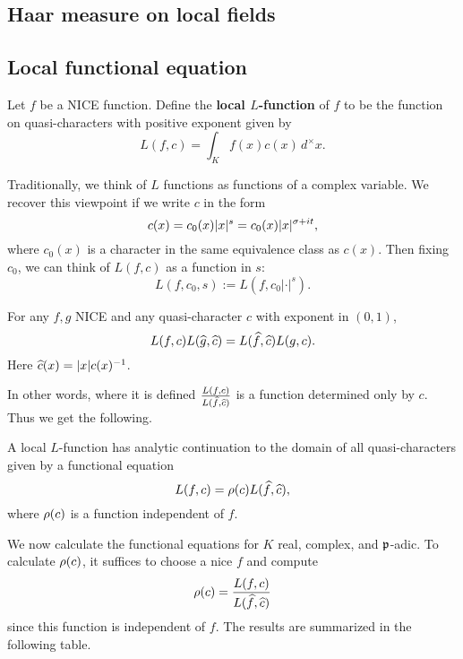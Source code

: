 \subsection{Haar measure on local fields}
\subsection{Local functional equation}
\begin{df}
Let $f$ be a NICE function. Define the \textbf{local $L$-function} of $f$ to be the function on quasi-characters with positive exponent given by
\[
L(f,c)=\int_{K} f(x)c(x)\,d^{\times}x.
\]
\end{df}
Traditionally, we think of $L$ functions as functions of a complex variable. We recover this viewpoint if we write $c$ in the form
\[
c(x)=c_0(x)|x|^{s}=c_0(x)|x|^{\sigma+it},
\]
where $c_0(x)$ is a character in the same equivalence class as $c(x)$. Then fixing $c_0$, we can think of $L(f,c)$ as a function in $s$:
\[
L(f,c_0,s):=L(f,c_0|\cdot |^s).
\]
\begin{lem}
For any $f,g$ NICE and any quasi-character $c$ with exponent in $(0,1)$,
\[
L(f,c)L(\widehat{g},\widehat{c})=L(\widehat{f},\widehat{c})L(g,c).
\]
Here $\widehat{c}(x)=|x|c(x)^{-1}$.
\end{lem}
In other words, where it is defined $\frac{L(f,c)}{L(\widehat{f},\widehat{c})}$ is a function determined only by $c$. Thus we get the following.
\begin{thm}
A local $L$-function has analytic continuation to the domain of all quasi-characters given by a functional equation
\[
L(f,c)=\rho(c)L(\widehat{f},\widehat{c}),
\]
where $\rho(c)$ is a function independent of $f$.
\end{thm}
We now calculate the functional equations for $K$ real, complex, and $\mathfrak{p}$-adic. To calculate $\rho(c)$, it suffices to choose a nice $f$ and compute
\[
\rho(c)=\frac{L(f,c)}{L(\widehat{f},\widehat{c})}
\]
since this function is independent of $f$.
The results are summarized in the following table.
